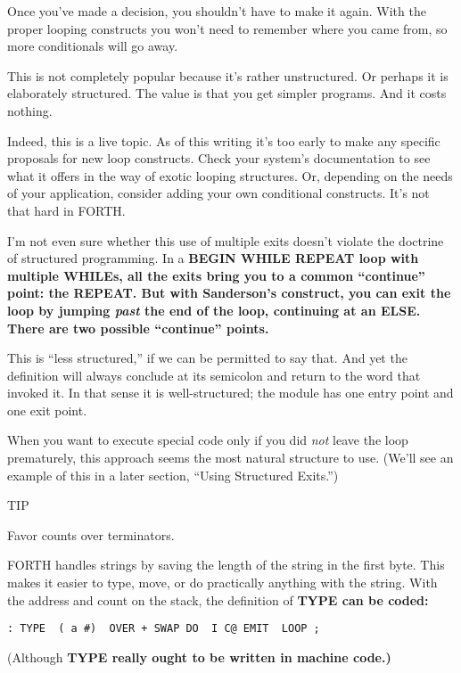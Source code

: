 Once you've made a decision, you shouldn't have to make it again. With the
proper looping constructs you won't need to remember where you came
from, so more conditionals will go away.

This is not completely popular because it's rather unstructured. Or perhaps
it is elaborately structured. The value is that you get simpler programs.
And it costs nothing.

Indeed, this is a live topic. As of this writing it's too early to make any
specific proposals for new loop constructs. Check your system's
documentation to see what it offers in the way of exotic looping structures.
Or, depending on the needs of your application, consider adding
your own conditional constructs. It's not that hard in FORTH.

I'm not even sure whether this use of multiple exits doesn't violate
the doctrine of structured programming. In a \bf{BEGIN WHILE REPEAT}
loop with multiple \bf{WHILE}s, all the exits bring you to a common
``continue'' point: the \bf{REPEAT}. But with Sanderson's construct, you
can exit the loop by jumping \emph{past} the end of the loop, continuing
at an \bf{ELSE}. There are two possible ``continue'' points.

This is ``less structured,'' if we can be permitted to say that. And
yet the definition will always conclude at its semicolon and return to the
word that invoked it. In that sense it is well-structured; the module has
one entry point and one exit point.

When you want to execute special code only if you did \emph{not} leave the
loop prematurely, this approach seems the most natural structure to use.
(We'll see an example of this in a later section, ``Using Structured
Exits.'')

TIP

Favor counts over terminators.

FORTH handles strings by saving the length of the string in the first
byte. This makes it easier to type, move, or do practically anything with
the string. With the address and count on the stack, the definition of
\bf{TYPE} can be coded:

\begin{verbatim}
: TYPE  ( a #)  OVER + SWAP DO  I C@ EMIT  LOOP ;
\end{verbatim}

(Although \bf{TYPE} really ought to be written in machine code.)

